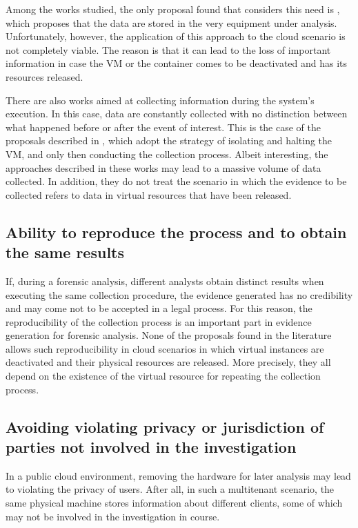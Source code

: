 \documentclass[conference]{IEEEtran}
\begin{document}
Among the works studied, the only proposal found that considers this need is \cite{Dezfouli_Backup_approach:2012}, which proposes that the data are stored in the very equipment under analysis.
%
Unfortunately, however, the application of this approach to the cloud scenario is not completely viable.
%
The reason is that it can lead to the loss of important information in case the VM or the container comes to be deactivated and has its resources released.


There are also works aimed at collecting information during the system's execution.
%
In this case, data are constantly collected with no distinction between what happened before or after the event of interest.
%
This is the case of the proposals described in \cite{Poisel_VMI:2013,Dykstra_FROST:2013,Sang_Log_approach:2013}, which adopt the strategy of isolating and halting the VM, and only then conducting the collection process. 
%
Albeit interesting, the approaches described in these works may lead to a massive volume of data collected.
%
In addition, they do not treat the scenario in which the evidence to be collected refers to data in virtual resources that have been released.


\subsection{Ability to reproduce the process and to obtain the same results}

If, during a forensic analysis, different analysts obtain distinct results when executing the same collection procedure, the evidence generated has no credibility and may come not to be accepted in a legal process. 
%
For this reason, the reproducibility of the collection process is an important part in evidence generation for forensic analysis.
%
None of the proposals found in the literature allows such reproducibility in cloud scenarios in which virtual instances are deactivated and their physical resources are released.
%
More precisely, they all depend on the existence of the virtual resource for repeating the collection process.


\subsection{Avoiding violating privacy or jurisdiction of parties not involved in the investigation}

In a public cloud environment, removing the hardware for later analysis may lead to violating the privacy of users.
%
After all, in such a multitenant scenario, the same physical machine stores information about different clients, some of which may not be involved in the investigation in course.
\end{document}
